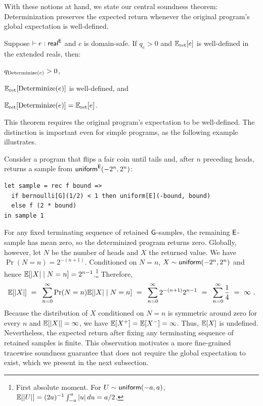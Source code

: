 With these notions at hand, we state our central soundness theorem: Determinization preserves the expected
return whenever the original program's global expectation is well-defined.

\begin{theorem}
\label{thm:expectation}
Suppose $\vdash e:\mathsf{real}^{\mathsf{E}}$ and $e$ is domain-safe. If $q_e>0$ and
$\mathbb{E}_{\mathrm{ret}}[e]$ is well-defined in the extended reals, then:
%
\begin{enumerate*}
 \item $q_{\operatorname{Determinize}(e)}>0$,
 \item $\mathbb{E}_{\mathrm{ret}}[\operatorname{Determinize}(e)]$ is well-defined, and
 \item $\mathbb{E}_{\mathrm{ret}}[\operatorname{Determinize}(e)] =\mathbb{E}_{\mathrm{ret}}[e]$.
\end{enumerate*}
\end{theorem}

This theorem requires the original program's
expectation to be well-defined. The distinction is important even for
simple programs, as the following example illustrates.

\begin{example}\label{ex:coin-flip}
Consider a program that flips a fair coin until tails and, after $n$
preceding heads, returns a sample from
$\mathsf{uniform}^{\mathsf{E}}(-2^n,2^n)$:

\begin{lstlisting}
let sample = rec f bound =>
  if bernoulli[G](1/2) < 1 then uniform[E](-bound, bound)
  else f (2 * bound)
in sample 1
\end{lstlisting}

For any fixed terminating sequence of retained $\mathsf{G}$-samples, the remaining
$\mathsf{E}$-sample has mean zero, so the determinized program returns zero.
Globally, however, let $N$ be the number of heads and $X$ the returned
value. We have $\Pr(N=n)=2^{-(n+1)}$. Conditioned on $N=n$,
$X\sim\mathsf{uniform}(-2^n,2^n)$ and hence
$\mathbb{E}[|X|\mid N=n]=2^{n-1}$.\footnote{First absolute moment. For
$U\sim\mathsf{uniform}(-a,a)$,
$\mathbb{E}[|U|]=(2a)^{-1}\int_{-a}^{a}|u|\,du=a/2$.} Therefore,
\[
  \mathbb{E}[|X|]
  ~{}={}~\sum_{n=0}^{\infty}\Pr(N=n)\mathbb{E}[|X|\mid N=n]
  ~{}={}~\sum_{n=0}^{\infty}2^{-(n+1)}2^{n-1}
  ~{}={}~\sum_{n=0}^{\infty}\frac14
  ~{}={}~\infty~.
\]
Because the distribution of $X$ conditioned on $N=n$ is symmetric
around zero for every $n$ and $\mathbb{E}[|X|]=\infty$, we have
$\mathbb{E}[X^+]=\mathbb{E}[X^-]=\infty$. Thus,
$\mathbb{E}[X]$ is undefined. Nevertheless, the expected return after
fixing any terminating sequence of retained samples is finite. This observation
motivates a more fine-grained tracewise soundness guarantee that does not require the
global expectation to exist, which we present in the next subsection.
\end{example}

